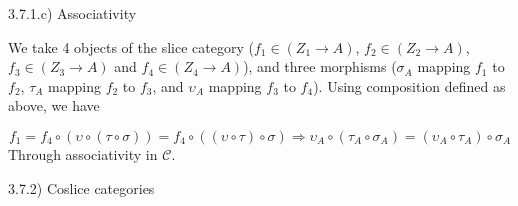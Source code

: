 3.7.1.c) Associativity

We take 4 objects of the slice category ($f_1 \in (Z_1 \to A)$, $f_2 \in (Z_2 \to A)$, $f_3 \in (Z_3 \to A)$ and  $f_4 \in (Z_4 \to A)$), and three morphisms ($\sigma_A$ mapping $f_1$ to $f_2$, $\tau_A$ mapping $f_2$ to $f_3$, and $\upsilon_A$ mapping $f_3$ to $f_4$). Using composition defined as above, we have

$$
f_1 = f_4 \circ ( \upsilon \circ (\tau  \circ \sigma))
	= f_4 \circ ((\upsilon \circ  \tau) \circ \sigma )
\Rightarrow
  \upsilon_A \circ (\tau_A  \circ \sigma_A)
= (\upsilon_A \circ  \tau_A) \circ \sigma_A
$$
Through associativity in $\mathcal{C}$.


3.7.2) Coslice categories


